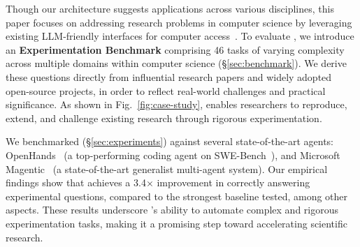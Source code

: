 Though our architecture suggests applications across various disciplines, 
this paper focuses on addressing research problems in computer science by leveraging existing LLM-friendly interfaces for computer access~\cite{claude-computer-use, yang2024swe}.
To evaluate \sys, we introduce an \textbf{Experimentation Benchmark} comprising 46 tasks of varying complexity across multiple domains within computer science (\S\ref{sec:benchmark}). 
We derive these questions directly from influential research papers and widely adopted open-source projects, in order to reflect real-world challenges and practical significance. 
As shown in Fig.~\ref{fig:case-study}, \sys enables researchers to reproduce, extend, and
challenge
existing research through rigorous experimentation.

We benchmarked \sys (\S\ref{sec:experiments}) against several state-of-the-art agents: OpenHands~\cite{wang2024openhands} (a top-performing coding agent on SWE-Bench~\cite{jimenez2023swe}), and Microsoft Magentic~\cite{fourney2024magentic} (a state-of-the-art generalist multi-agent system).
Our empirical findings show that \sys achieves a 3.4$\times$ improvement in correctly answering experimental questions, compared to the strongest baseline tested, among other aspects. 
These results underscore \sys's ability to automate complex and rigorous experimentation tasks, making it a promising step toward accelerating scientific research.
